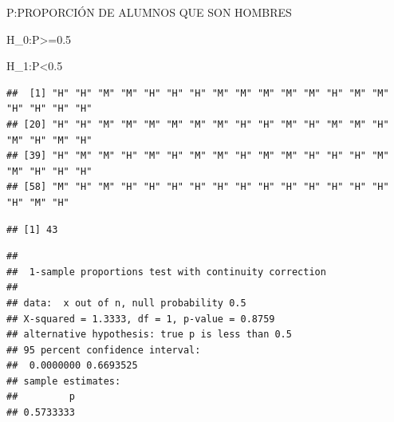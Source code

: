 \documentclass[
]{article}
\newenvironment{Shaded}{\begin{snugshade}}{\end{snugshade}}
\newcommand{\AttributeTok}[1]{\textcolor[rgb]{0.13,0.29,0.53}{#1}}
\newcommand{\FloatTok}[1]{\textcolor[rgb]{0.00,0.00,0.81}{#1}}
\newcommand{\FunctionTok}[1]{\textcolor[rgb]{0.13,0.29,0.53}{\textbf{#1}}}
\newcommand{\NormalTok}[1]{#1}
\newcommand{\OtherTok}[1]{\textcolor[rgb]{0.56,0.35,0.01}{#1}}
\newcommand{\SpecialCharTok}[1]{\textcolor[rgb]{0.81,0.36,0.00}{\textbf{#1}}}
\newcommand{\StringTok}[1]{\textcolor[rgb]{0.31,0.60,0.02}{#1}}
\begin{document}
P:PROPORCIÓN DE ALUMNOS QUE SON HOMBRES

H\_0:P\textgreater=0.5

H\_1:P\textless0.5

\begin{Shaded}
\end{Shaded}

\begin{verbatim}
##  [1] "H" "H" "M" "M" "H" "H" "H" "M" "M" "M" "M" "M" "H" "M" "M" "H" "H" "H" "H"
## [20] "H" "H" "M" "M" "M" "M" "M" "M" "H" "H" "M" "H" "M" "M" "H" "M" "H" "M" "H"
## [39] "H" "M" "M" "H" "M" "H" "M" "M" "H" "M" "M" "H" "H" "H" "M" "M" "H" "H" "H"
## [58] "M" "H" "M" "H" "H" "H" "H" "H" "H" "H" "H" "H" "H" "H" "H" "H" "M" "H"
\end{verbatim}

\begin{Shaded}
\end{Shaded}

\begin{verbatim}
## [1] 43
\end{verbatim}

\begin{Shaded}
\end{Shaded}

\begin{verbatim}
## 
##  1-sample proportions test with continuity correction
## 
## data:  x out of n, null probability 0.5
## X-squared = 1.3333, df = 1, p-value = 0.8759
## alternative hypothesis: true p is less than 0.5
## 95 percent confidence interval:
##  0.0000000 0.6693525
## sample estimates:
##         p 
## 0.5733333
\end{verbatim}
\end{document}
